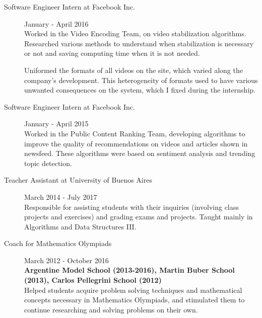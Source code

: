 \documentclass [a4paper, 11pt]{article}
\newcommand{\tabu}{\hspace*{0.7cm}}
\begin{document}
\begin{description}
  \item[Software Engineer Intern at Facebook Inc.] {\hfill January - April 2016\\
  Worked in the Video Encoding Team, on video stabilization algorithms. Researched various methods to understand when stabilization is necessary or not and saving computing time when it is not needed. %

Uniformed the formats of all videos on the site, which varied along the company's development. This heterogeneity of formats used to have various unwanted consequences on the system, which I fixed during the internship.
}

  \item[Software Engineer Intern at Facebook Inc.] {\hfill January - April 2015\\
Worked in the Public Content Ranking Team, developing algorithms to improve the quality of recommendations on videos and articles shown in newsfeed. These algorithms were based on sentiment analysis and trending topic detection. %
}

  \item[Teacher Assistant at University of Buenos Aires] {\hfill March 2014 - July 2017\\
  Responsible for assisting students with their inquiries (involving class projects and 
  exercises) and grading exams and projects. Taught mainly in Algorithms 
  and Data Structures III.
}

\item[Coach for Mathematics Olympiads] {\hfill March 2012 - October 2016 \\ 
\textbf{\small Argentine Model School (2013-2016), Martin Buber School (2013), Carlos Pellegrini School (2012)} \\
Helped students acquire problem solving techniques and mathematical concepts necessary in Mathematics Olympiads, and stimulated them to continue researching and solving problems on their own.
	}

\end{description}
\end{document}
